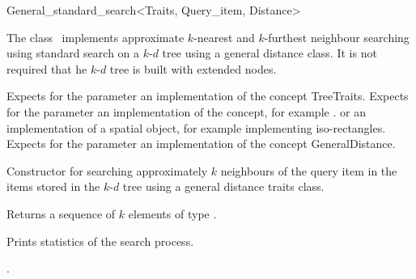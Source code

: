 

\begin{ccRefClass}{General_standard_search<Traits, Query_item, Distance>}  %


\ccDefinition
  
The class \ccRefName\ implements approximate $k$-nearest and $k$-furthest neighbour searching
using standard search on a $k$-$d$ tree using a general distance 
class. It is not required that he $k$-$d$ tree is built with extended nodes.


\ccParameters

Expects for the parameter  an implementation of the concept TreeTraits.
Expects for the parameter   an implementation of the
 concept, for example .
or an implementation of a spatial object, for
example  implementing iso-rectangles.
Expects for the parameter  an implementation of the
concept GeneralDistance.

\ccTypes



\ccCreation
{}  %

{Constructor for searching approximately $k$ neighbours of the query item  
in the items stored in the $k$-$d$ tree  using a general distance
traits class.} 


{Returns a sequence of $k$ elements of type }. 

{
Prints statistics of the search process.
}

\ccSeeAlso

.

\end{ccRefClass}


